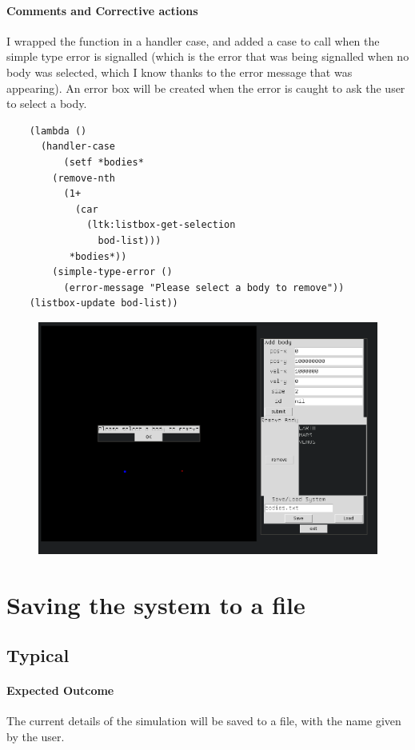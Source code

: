 \paragraph{Comments and Corrective actions}

I wrapped the function in a handler case, and added a case to call when the
simple type error is signalled (which is the error that was being signalled when
no body was selected, which I know thanks to the error message that was
appearing). An error box will be created when the error is caught to ask the
user to select a body.

\begin{lstlisting}
	(lambda ()
  	  (handler-case 
  	      (setf *bodies*
		(remove-nth 
		  (1+ 
		    (car 
		      (ltk:listbox-get-selection 
		        bod-list)))
		   *bodies*))
	    (simple-type-error () 
	      (error-message "Please select a body to remove"))
	(listbox-update bod-list))
\end{lstlisting}
\begin{figure}[H]
	\includegraphics[width=\textwidth]{./img/rm3.png}
\end{figure}

\section{Saving the system to a file}
\subsection{Typical}
\paragraph{Expected Outcome}
The current details of the simulation will be saved to a file, with the name
given by the user.

